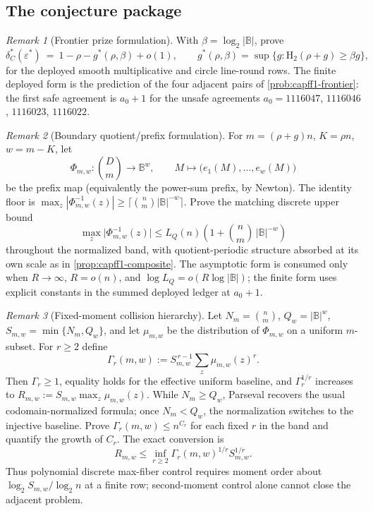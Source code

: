 \documentclass[11pt]{article}
\theoremstyle{definition}
\theoremstyle{remark}
\newtheorem{remark}[remark]{Remark}
\newcommand{\B}{\mathbb{B}}
\newcommand{\Hb}{\mathrm{H}_2}
\begin{document}
\subsection{The conjecture package}

\begin{remark}[Frontier prize formulation]\label{prob:capfp-F}
With $\beta=\log_2|\B|$, prove
\[
        \delta^*_C(\varepsilon^*)\ =\ 1-\rho-g^*(\rho,\beta)+o(1),
        \qquad
        g^*(\rho,\beta)=\sup\{g:\Hb(\rho+g)\ge\beta g\},
\]
for the deployed smooth multiplicative and circle line-round rows.  The finite deployed form is the prediction of the four adjacent pairs of \cref{prob:capff1-frontier}: the first safe agreement is $a_0+1$ for the unsafe agreements $a_0=1116047$, $1116046$, $1116023$, $1116022$.
\end{remark}

\begin{remark}[Boundary quotient/prefix formulation]\label{prob:capfp-Q}
For $m=(\rho+g)n$, $K=\rho n$, $w=m-K$, let
\[
        \Phi_{m,w}:\binom Dm\to\B^w,\qquad M\mapsto\bigl(e_1(M),\ldots,e_w(M)\bigr)
\]
be the prefix map \textup(equivalently the power-sum prefix, by Newton\textup).
The identity floor is
$\max_z|\Phi_{m,w}^{-1}(z)|\ge\lceil\binom nm|\B|^{-w}\rceil$.  Prove the
matching discrete upper bound
\[
        \max_z\bigl|\Phi_{m,w}^{-1}(z)\bigr|
        \le L_Q(n)\left(1+\binom nm\,|\B|^{-w}\right)
\]
throughout the normalized band, with quotient-periodic structure absorbed at
its own scale as in \cref{prop:capff1-composite}.  The asymptotic form is
consumed only when $R\to\infty$, $R=o(n)$, and $\log L_Q=o(R\log|\B|)$; the finite form uses explicit
constants in the summed deployed ledger at $a_0+1$.
\end{remark}

\begin{remark}[Fixed-moment collision hierarchy]\label{prob:capfp-gamma}
Let $N_m=\binom nm$, $Q_w=|\B|^w$, $S_{m,w}=\min\{N_m,Q_w\}$, and let
$\mu_{m,w}$ be the distribution of $\Phi_{m,w}$ on a uniform $m$-subset.  For
$r\ge2$ define
\[
        \Gamma_r(m,w):=S_{m,w}^{\,r-1}\sum_z\mu_{m,w}(z)^r.
\]
Then $\Gamma_r\ge1$, equality holds for the effective uniform baseline, and
$\Gamma_r^{1/r}$ increases to
$R_{m,w}:=S_{m,w}\max_z\mu_{m,w}(z)$.  While $N_m\ge Q_w$, Parseval recovers the
usual codomain-normalized formula; once $N_m<Q_w$, the normalization switches
to the injective baseline.  Prove $\Gamma_r(m,w)\le n^{C_r}$ for each fixed
$r$ in the band and quantify the growth of $C_r$.  The exact conversion is
\[
        R_{m,w}\le \inf_{r\ge2}\Gamma_r(m,w)^{1/r}S_{m,w}^{1/r}.
\]
Thus polynomial discrete max-fiber control requires moment order about
$\log_2S_{m,w}/\log_2n$ at a finite row; second-moment control alone cannot
close the adjacent problem.
\end{remark}
\end{document}
